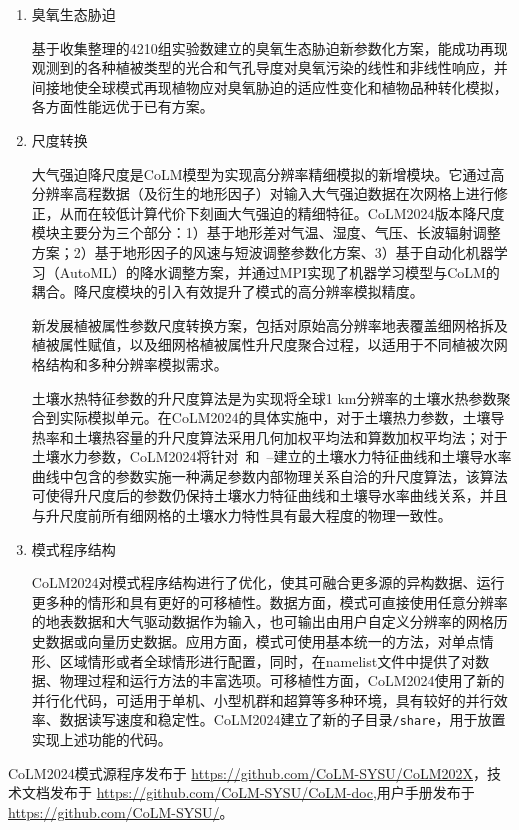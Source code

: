 \begin{enumerate}[label={\arabic*)}]
    \item 臭氧生态胁迫

    基于收集整理的4210组实验数建立的臭氧生态胁迫新参数化方案，能成功再现观测到的各种植被类型的光合和气孔导度对臭氧污染的线性和非线性响应，并间接地使全球模式再现植物应对臭氧胁迫的适应性变化和植物品种转化模拟，各方面性能远优于已有方案。
    
    \item 尺度转换

    大气强迫降尺度是CoLM模型为实现高分辨率精细模拟的新增模块。它通过高分辨率高程数据（及衍生的地形因子）对输入大气强迫数据在次网格上进行修正，从而在较低计算代价下刻画大气强迫的精细特征。CoLM2024版本降尺度模块主要分为三个部分：1）基于地形差对气温、湿度、气压、长波辐射调整方案；2）基于地形因子的风速与短波调整参数化方案、3）基于自动化机器学习（AutoML）的降水调整方案，并通过MPI实现了机器学习模型与CoLM的耦合。降尺度模块的引入有效提升了模式的高分辨率模拟精度。

    新发展植被属性参数尺度转换方案，包括对原始高分辨率地表覆盖细网格拆及植被属性赋值，以及细网格植被属性升尺度聚合过程，以适用于不同植被次网格结构和多种分辨率模拟需求。

    土壤水热特征参数的升尺度算法是为实现将全球1 km分辨率的土壤水热参数聚合到实际模拟单元。在CoLM2024的具体实施中，对于土壤热力参数，土壤导热率和土壤热容量的升尺度算法采用几何加权平均法和算数加权平均法；对于土壤水力参数，CoLM2024将针对~\citet{campbell1974}和~\citet{van1980closed}–\citet{mualem1976new}建立的土壤水力特征曲线和土壤导水率曲线中包含的参数实施一种满足参数内部物理关系自洽的升尺度算法，该算法可使得升尺度后的参数仍保持土壤水力特征曲线和土壤导水率曲线关系，并且与升尺度前所有细网格的土壤水力特性具有最大程度的物理一致性。
    
    \item 模式程序结构
    
    CoLM2024对模式程序结构进行了优化，使其可融合更多源的异构数据、运行更多种的情形和具有更好的可移植性。数据方面，模式可直接使用任意分辨率的地表数据和大气驱动数据作为输入，也可输出由用户自定义分辨率的网格历史数据或向量历史数据。应用方面，模式可使用基本统一的方法，对单点情形、区域情形或者全球情形进行配置，同时，在namelist文件中提供了对数据、物理过程和运行方法的丰富选项。可移植性方面，CoLM2024使用了新的并行化代码，可适用于单机、小型机群和超算等多种环境，具有较好的并行效率、数据读写速度和稳定性。CoLM2024建立了新的子目录\texttt{/share}，用于放置实现上述功能的代码。
    
\end{enumerate}

CoLM2024模式源程序发布于 \url{https://github.com/CoLM-SYSU/CoLM202X}，技术文档发布于 \url{https://github.com/CoLM-SYSU/CoLM-doc},用户手册发布于\url{https://github.com/CoLM-SYSU/}。
